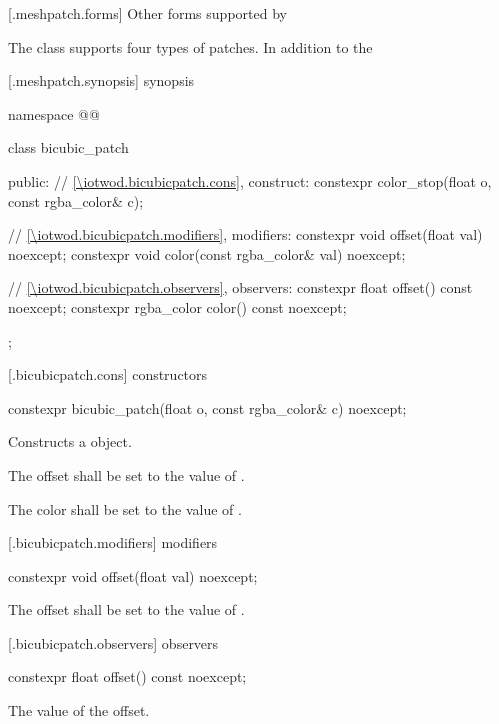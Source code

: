  [\iotwod.meshpatch.forms] {Other forms supported by }

\pnum
The  class supports four types of patches. In addition to the 

 [\iotwod.meshpatch.synopsis] { synopsis}

\begin{codeblock}
namespace @\fullnamespace{}@ {
  class bicubic_patch {
  public:
  	// \ref{\iotwod.bicubicpatch.cons}, construct:
    constexpr color_stop(float o, const rgba_color& c);
    
    // \ref{\iotwod.bicubicpatch.modifiers}, modifiers:
    constexpr void offset(float val) noexcept;
	constexpr void color(const rgba_color& val) noexcept;
	
    // \ref{\iotwod.bicubicpatch.observers}, observers:
	constexpr float offset() const noexcept;
	constexpr rgba_color color() const noexcept;
  };
}
\end{codeblock}

 [\iotwod.bicubicpatch.cons]{ constructors}

%
\begin{itemdecl}
constexpr bicubic_patch(float o, const rgba_color& c) noexcept;
\end{itemdecl}
\begin{itemdescr}
\pnum
\effects
Constructs a  object.

\pnum
The offset shall be set to the value of .

\pnum
The color shall be set to the value of .
\end{itemdescr}

 [\iotwod.bicubicpatch.modifiers]{ modifiers}

%
\begin{itemdecl}
constexpr void offset(float val) noexcept;
\end{itemdecl}
\begin{itemdescr}
\pnum
\effects
The offset shall be set to the value of .
\end{itemdescr}

 [\iotwod.bicubicpatch.observers]{ observers}

%
\begin{itemdecl}
constexpr float offset() const noexcept;
\end{itemdecl}
\begin{itemdescr}
\pnum
\returns
The value of the offset.
\end{itemdescr}
